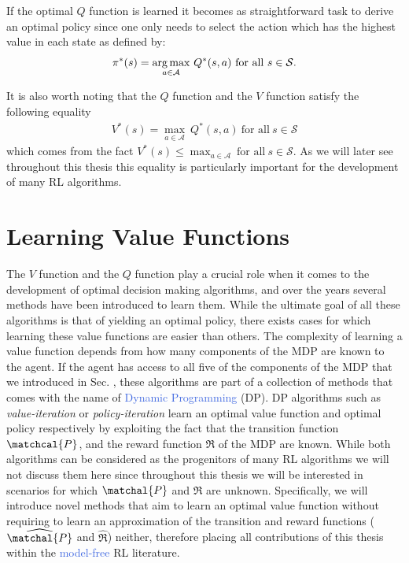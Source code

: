 If the optimal $Q$ function is learned it becomes as straightforward task to derive an optimal policy since one only needs to select the action which has the highest value in each state as defined by:
\begin{equation}
	\pi^{*}(s) = \underset{a\in\mathcal{A}}{\operatorname*{arg\,max}} \ Q^{*}(s,a) \ \text{for all} \ s \in \mathcal{S}.
\end{equation}

It is also worth noting that the $Q$ function and the $V$ function satisfy the following equality
\begin{align}
	V^{*}(s) = \underset{a\in\mathcal{A}}{\max} \ Q^{*}(s,a) \ \text{for all} \ s \in \mathcal{S}
\end{align}
which comes from the fact $V^{*}(s) \leq \max_{a\in\mathcal{A}} \ \text{for all} \ s\in\mathcal{S}$. As we will later see throughout this thesis this equality is particularly important for the development of many RL algorithms.


\section{Learning Value Functions}
The $V$ function and the $Q$ function play a crucial role when it comes to the development of optimal decision making algorithms, and over the years several methods have been introduced to learn them. While the ultimate goal of all these algorithms is that of yielding an optimal policy, there exists cases for which learning these value functions are easier than others. The complexity of learning a value function depends from how many components of the MDP are known to the agent. If the agent has access to all five of the components of the MDP that we introduced in Sec. , these algorithms are part of a collection of methods that comes with the name of \textcolor{RoyalBlue}{Dynamic Programming} (DP). DP algorithms such as \textit{value-iteration} or \textit{policy-iteration} learn an optimal value function and optimal policy respectively by exploiting the fact that the transition function $\matchcal{P}$, and the reward function $\Re$ of the MDP are known. While both algorithms can be considered as the progenitors of many RL algorithms we will not discuss them here since throughout this thesis we will be interested in scenarios for which $\matchal{P}$ and $\Re$ are unknown. Specifically, we will introduce novel methods that aim to learn an optimal value function without requiring to learn an approximation of the transition and reward functions ($\widehat{\matchal{P}}$ and $\widehat{\mathcal{\Re}}$) neither, therefore placing all contributions of this thesis within the \textcolor{RoyalBlue}{model-free} RL literature. 

